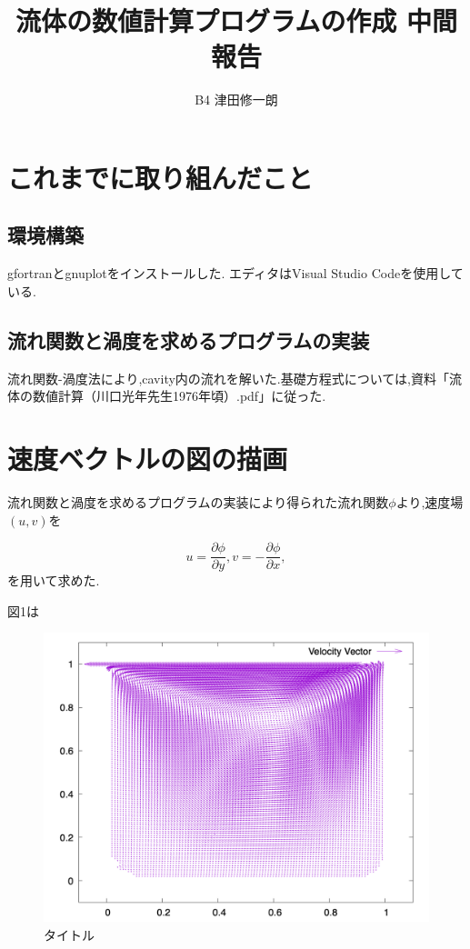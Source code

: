 \documentclass[upLaTeX,a4paper]{jsarticle}
\title{流体の数値計算プログラムの作成 中間報告}
\author{B4 津田修一朗}
\date{}
\begin{document}
\maketitle

\section{これまでに取り組んだこと}
\subsection{環境構築}
gfortranとgnuplotをインストールした.
エディタはVisual Studio Codeを使用している.

\subsection{流れ関数と渦度を求めるプログラムの実装}
流れ関数-渦度法により,cavity内の流れを解いた.基礎方程式については,資料「流体の数値計算（川口光年先生1976年頃）.pdf」に従った.

\section{速度ベクトルの図の描画}
流れ関数と渦度を求めるプログラムの実装により得られた流れ関数$\phi$より,速度場$(u, v)$を

\begin{equation}
  u = \frac{\partial \phi}{\partial y}, v = - \frac{\partial \phi}{\partial x},
\end{equation}
を用いて求めた.

図1は
\begin{figure}[htbp]
  \begin{center}
    \includegraphics[width=15cm]{outputs/img/velocity_vector.png}
  \end{center}
  \caption{タイトル}
  \label{picture}
\end{figure}
\end{document}
